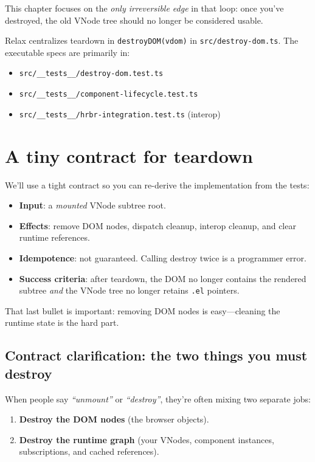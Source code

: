 This chapter focuses on the \emph{only irreversible edge} in that loop: once you've destroyed, the old VNode tree should no longer be considered usable.

Relax centralizes teardown in \texttt{destroyDOM(vdom)} in \texttt{src/destroy-dom.ts}. The executable specs are primarily in:

\begin{itemize}
  \item \texttt{src/\_\_tests\_\_/destroy-dom.test.ts}
  \item \texttt{src/\_\_tests\_\_/component-lifecycle.test.ts}
  \item \texttt{src/\_\_tests\_\_/hrbr-integration.test.ts} (interop)
\end{itemize}

\section{A tiny contract for teardown}

We'll use a tight contract so you can re-derive the implementation from the tests:

\begin{itemize}
  \item \textbf{Input}: a \emph{mounted} VNode subtree root.
  \item \textbf{Effects}: remove DOM nodes, dispatch cleanup, interop cleanup, and clear runtime references.
  \item \textbf{Idempotence}: not guaranteed. Calling destroy twice is a programmer error.
  \item \textbf{Success criteria}: after teardown, the DOM no longer contains the rendered subtree \emph{and} the VNode tree no longer retains \texttt{.el} pointers.
\end{itemize}

That last bullet is important: removing DOM nodes is easy---cleaning the runtime state is the hard part.

\subsection{Contract clarification: the two things you must destroy}

When people say \emph{``unmount''} or \emph{``destroy''}, they're often mixing two separate jobs:

\begin{enumerate}
  \item \textbf{Destroy the DOM nodes} (the browser objects).
  \item \textbf{Destroy the runtime graph} (your VNodes, component instances, subscriptions, and cached references).
\end{enumerate}


